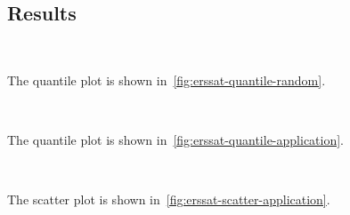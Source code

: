 \subsection{Results}

\begin{figure*}[ht]
    \centering
    \\
    \caption{Quantile plots of random $k$-CNF formulas}
    \label{fig:erssat-quantile-random}
\end{figure*}

The quantile plot is shown in~\cref{fig:erssat-quantile-random}.

\begin{figure*}[ht]
    \centering
    \\
    \caption{Quantile plots of application formulas}
    \label{fig:erssat-quantile-application}
\end{figure*}

The quantile plot is shown in~\cref{fig:erssat-quantile-application}.

\begin{figure*}[ht]
    \centering
    \subfloat[\erssatb]{
        
        \label{fig:erssat-scatter-cputime-application}
    }\\
    \subfloat[\dcssat]{
        
        \label{fig:dcssat-scatter-cputime-application}
    }
    \caption{CPU-time scatter plots of application formulas with \erssat in y-axis and compared approaches in x-axis}
    \label{fig:erssat-scatter-application}
\end{figure*}

The scatter plot is shown in~\cref{fig:erssat-scatter-application}.